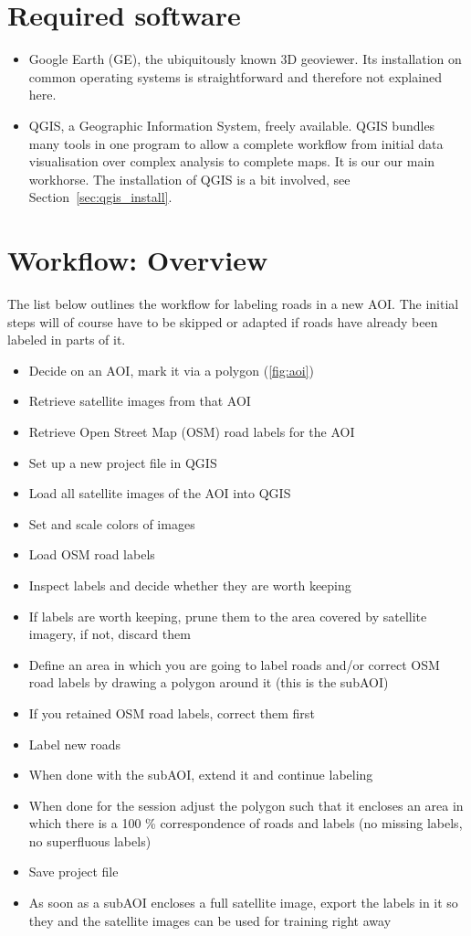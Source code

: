 \documentclass[12pt,a4paper]{scrartcl}
\begin{document}
\section{Required software}
\label{sec:software}
\begin{itemize}
	\item Google Earth (GE), the ubiquitously known 3D geoviewer. Its installation on common operating systems is straightforward and therefore not explained here.
	\item QGIS, a Geographic Information System, freely available. QGIS bundles many tools in one program to allow a complete workflow from initial data visualisation over complex analysis to complete maps. It is our our main workhorse. The installation of QGIS is a bit involved, see Section~\ref{sec:qgis_install}.
\end{itemize}
	

\section{Workflow: Overview}
The list below outlines the workflow for labeling roads in a new AOI. The initial steps will of course have to be skipped or adapted if roads have already been labeled in parts of it.
\begin{itemize}
	\item Decide on an AOI, mark it via a polygon (\ref{fig:aoi})
	\item Retrieve satellite images from that AOI
	\item Retrieve Open Street Map (OSM) road labels for the AOI
	\item Set up a new project file in QGIS
	\item Load all satellite images of the AOI into QGIS
	\item Set and scale colors of images
	\item Load OSM road labels
	\item Inspect labels and decide whether they are worth keeping
	\item If labels are worth keeping, prune them to the area covered by satellite imagery, if not, discard them
	\item Define an area in which you are going to label roads and/or correct OSM road labels by drawing a polygon around it (this is the subAOI)
	\item If you retained OSM road labels, correct them first
	\item Label new roads
	\item When done with the subAOI, extend it and continue labeling
	\item When done for the session adjust the polygon such that it encloses an area in which there is a 100 \%  correspondence of roads and labels (no missing labels, no superfluous labels)
    \item Save project file
    \item As soon as a subAOI encloses a full satellite image, export the labels in it so they and the satellite images can be used for training right away
\end{itemize}
\end{document}
